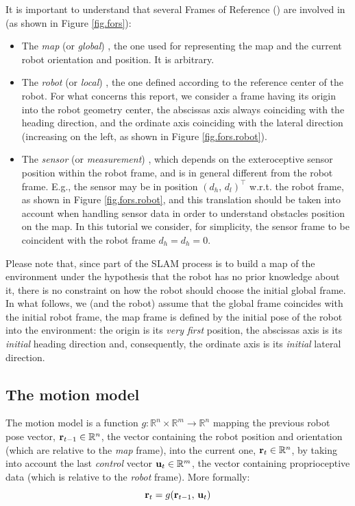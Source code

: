 It is important to understand that several Frames of Reference (\FoR{}) are involved in \SLAM{} (as shown in Figure \ref{fig.fors}):
\begin{itemize}
	\item The \emph{map} (or \emph{global}) \FoR{}, \ie{} the one used for representing the map and the current robot orientation and position. 
	It is arbitrary.
	
	\item The \emph{robot} (or \emph{local}) \FoR{}, \ie{} the one defined according to the reference center of the robot. 
	For what concerns this report, we consider a frame having its origin into the robot geometry center, the abscissas axis always coinciding with the heading direction, and the ordinate axis coinciding with the lateral direction (increasing on the left, as shown in Figure \ref{fig.fors.robot}).
	
	\item The \emph{sensor} (or \emph{measurement}) \FoR{}, which depends on the exteroceptive sensor position within the robot frame, and is in general different from the robot frame. 
	E.g., the sensor may be in position $(d_h,\, d_l)^\top$ w.r.t. the robot frame, as shown in Figure \ref{fig.fors.robot}, and this translation should be taken into account when handling sensor data in order to understand obstacles position on the map.
	In this tutorial we consider, for simplicity, the sensor frame to be coincident with the robot frame \ie{} $d_h = d_h = 0$.
	
\end{itemize}

Please note that, since part of the SLAM process is to build a map of the environment under the hypothesis that the robot has no prior knowledge about it, there is no constraint on how the robot should choose the initial global frame.
In what follows, we (and the robot) assume that the global frame coincides with the initial robot frame, \ie{} the map frame is defined by the initial pose of the robot into the environment: the origin is its \emph{very first} position, the abscissas axis is its \emph{initial} heading direction and, consequently, the ordinate axis is its \emph{initial} lateral direction.

\subsection{The motion model}
	The motion model is a function $g : \mathbb{R}^n \times \mathbb{R}^m \rightarrow \mathbb{R}^n$ mapping the previous robot pose vector, $\boldsymbol{\mathrm{{r}}}_{t-1} \in \mathbb{R}^n$, \ie{} the vector containing the robot position and orientation (which are relative to the \emph{map} frame), into the current one, $\boldsymbol{\mathrm{{r}}}_t \in \mathbb{R}^n$, by taking into account the last \emph{control} vector $\boldsymbol{\mathrm{{u}}}_t \in \mathbb{R}^m$, \ie{} the vector containing proprioceptive data (which is relative to the \emph{robot} frame). 
	More formally:
	\[
		\boldsymbol{\mathrm{{r}}}_t = g(\boldsymbol{\mathrm{{r}}}_{t-1},\, \boldsymbol{\mathrm{{u}}}_t)
	\]
	
